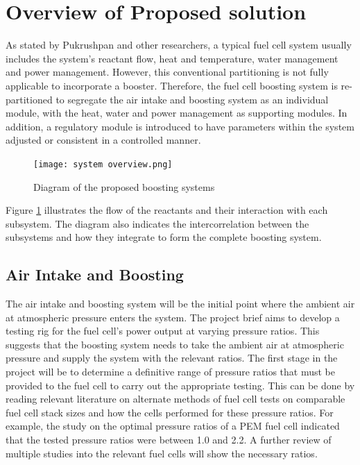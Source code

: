 \documentclass[a4paper,11pt]{article}
\begin{document}
\section{Overview of Proposed solution}

As stated by Pukrushpan \cite{pukrushpan2004control} and other researchers, a typical fuel cell system usually includes the system’s reactant flow, heat and temperature, water management and power management. However, this conventional partitioning is not fully applicable to incorporate a booster. Therefore, the fuel cell boosting system is re-partitioned to segregate the air intake and boosting system as an individual module, with the heat, water and power management as supporting modules. In addition, a regulatory module is introduced to have parameters within the system adjusted or consistent in a controlled manner.

\begin{figure}[h] 
    \texttt{[image: system overview.png]}
    \caption{Diagram of the proposed boosting systems}
    \centering  
    \label{fig:systemOverview}
\end{figure}

Figure \ref{fig:systemOverview} illustrates the flow of the reactants and their interaction with each subsystem. The diagram also indicates the intercorrelation between the subsystems and how they integrate to form the complete boosting system.


\subsection{Air Intake and Boosting}
The air intake and boosting system will be the initial point where the ambient air at atmospheric pressure enters the system. The project brief aims to develop a testing rig for the fuel cell's power output at varying pressure ratios. This suggests that the boosting system needs to take the ambient air at atmospheric pressure and supply the system with the relevant ratios. The first stage in the project will be to determine a definitive range of pressure ratios that must be provided to the fuel cell to carry out the appropriate testing. This can be done by reading relevant literature on alternate methods of fuel cell tests on comparable fuel cell stack sizes and how the cells performed for these pressure ratios. For example, the study on the optimal pressure ratios of a PEM fuel cell\cite{hoeflinger2020air} indicated that the tested pressure ratios were between 1.0 and 2.2. A further review of multiple studies into the relevant fuel cells will show the necessary ratios.
\end{document}
